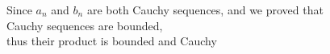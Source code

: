 \documentclass[preview]{standalone}
\begin{document}
\begin{center}
Since $a_n$ and $b_n$ are both Cauchy sequences, and we proved that\\Cauchy sequences are bounded, \\thus their product is bounded and Cauchy
\end{center}
\end{document}
